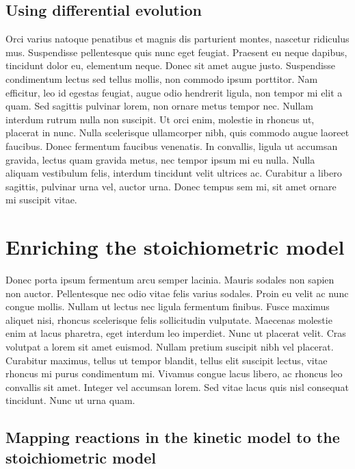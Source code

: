 \documentclass[parskip=full]{scrreprt}
\begin{document}
\section{Using differential evolution}
\label{sec:de}

Orci varius natoque penatibus et magnis dis parturient montes, nascetur ridiculus mus. Suspendisse pellentesque quis nunc eget feugiat. Praesent eu neque dapibus, tincidunt dolor eu, elementum neque. Donec sit amet augue justo. Suspendisse condimentum lectus sed tellus mollis, non commodo ipsum porttitor. Nam efficitur, leo id egestas feugiat, augue odio hendrerit ligula, non tempor mi elit a quam. Sed sagittis pulvinar lorem, non ornare metus tempor nec. Nullam interdum rutrum nulla non suscipit. Ut orci enim, molestie in rhoncus ut, placerat in nunc. Nulla scelerisque ullamcorper nibh, quis commodo augue laoreet faucibus. Donec fermentum faucibus venenatis. In convallis, ligula ut accumsan gravida, lectus quam gravida metus, nec tempor ipsum mi eu nulla. Nulla aliquam vestibulum felis, interdum tincidunt velit ultrices ac. Curabitur a libero sagittis, pulvinar urna vel, auctor urna. Donec tempus sem mi, sit amet ornare mi suscipit vitae.

\chapter{Enriching the stoichiometric model}
\label{ch:stoich}

Donec porta ipsum fermentum arcu semper lacinia. Mauris sodales non sapien non auctor. Pellentesque nec odio vitae felis varius sodales. Proin eu velit ac nunc congue mollis. Nullam ut lectus nec ligula fermentum finibus. Fusce maximus aliquet nisi, rhoncus scelerisque felis sollicitudin vulputate. Maecenas molestie enim at lacus pharetra, eget interdum leo imperdiet. Nunc ut placerat velit. Cras volutpat a lorem sit amet euismod. Nullam pretium suscipit nibh vel placerat. Curabitur maximus, tellus ut tempor blandit, tellus elit suscipit lectus, vitae rhoncus mi purus condimentum mi. Vivamus congue lacus libero, ac rhoncus leo convallis sit amet. Integer vel accumsan lorem. Sed vitae lacus quis nisl consequat tincidunt. Nunc ut urna quam. 

\section{Mapping reactions in the kinetic model to the stoichiometric model}
\label{sec:mapping}
\end{document}
